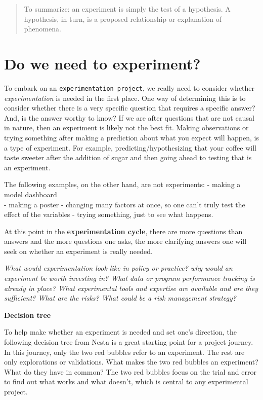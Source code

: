\documentclass[openany]{book}
\begin{document}
\begin{quote}
To summarize: an experiment is simply the test of a hypothesis. A hypothesis, in turn, is a proposed relationship or explanation of phenomena.
\end{quote}

\hypertarget{do-we-need-to-experiment}{%
\section{Do we need to experiment?}\label{do-we-need-to-experiment}}

To embark on an \texttt{experimentation\ project}, we really need to consider whether \emph{experimentation} is needed in the first place. One way of determining this is to consider whether there is a very specific question that requires a specific answer? And, is the answer worthy to know? If we are after questions that are not causal in nature, then an experiment is likely not the best fit.
Making observations or trying something after making a prediction about what you expect will happen, is a type of experiment. For example, predicting/hypothesizing that your coffee will taste sweeter after the addition of sugar and then going ahead to testing that is an experiment.

The following examples, on the other hand, are not experiments:
- making a model dashboard\\
- making a poster
- changing many factors at once, so one can't truly test the effect of the variables
- trying something, just to see what happens.

At this point in the \textbf{experimentation cycle}, there are more questions than answers and the more questions one asks, the more clarifying answers one will seek on whether an experiment is really needed.

\emph{What would experimentation look like in policy or practice? why would an experiment be worth investing in? What data or program performance tracking is already in place? What experimental tools and expertise are available and are they sufficient? What are the risks? What could be a risk management strategy?}

\textbf{Decision tree}

To help make whether an experiment is needed and set one's direction, the following decision tree from Nesta is a great starting point for a project journey. In this journey, only the two red bubbles refer to an experiment. The rest are only explorations or validations.
What makes the two red bubbles an experiment? What do they have in common? The two red bubbles focus on the trial and error to find out what works and what doesn't, which is central to any experimental project.
\end{document}
